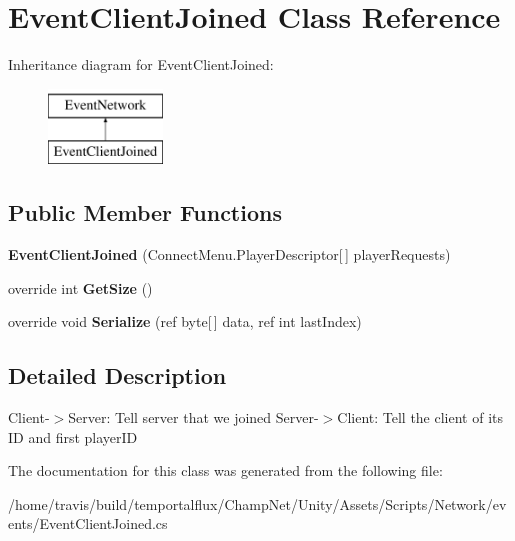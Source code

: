 \hypertarget{class_event_client_joined}{\section{Event\-Client\-Joined Class Reference}
\label{class_event_client_joined}
}
Inheritance diagram for Event\-Client\-Joined\-:\begin{figure}[H]
\begin{center}
\leavevmode
\includegraphics[height=2.000000cm]{class_event_client_joined}
\end{center}
\end{figure}
\subsection*{Public Member Functions}
\begin{DoxyCompactItemize}
\item 
\hypertarget{class_event_client_joined_adad9451ea1a292d0b4f6ce9465065bc4}{{\bfseries Event\-Client\-Joined} (Connect\-Menu.\-Player\-Descriptor\mbox{[}$\,$\mbox{]} player\-Requests)}\label{class_event_client_joined_adad9451ea1a292d0b4f6ce9465065bc4}

\item 
\hypertarget{class_event_client_joined_ad556a9c7eeb4a425ecf86ec271009241}{override int {\bfseries Get\-Size} ()}\label{class_event_client_joined_ad556a9c7eeb4a425ecf86ec271009241}

\item 
\hypertarget{class_event_client_joined_a10a9f8d247e3446fec1cc7a1eb13e6a0}{override void {\bfseries Serialize} (ref byte\mbox{[}$\,$\mbox{]} data, ref int last\-Index)}\label{class_event_client_joined_a10a9f8d247e3446fec1cc7a1eb13e6a0}

\end{DoxyCompactItemize}


\subsection{Detailed Description}
Client-\/$>$Server\-: Tell server that we joined Server-\/$>$Client\-: Tell the client of its I\-D and first player\-I\-D 

The documentation for this class was generated from the following file\-:\begin{DoxyCompactItemize}
\item 
/home/travis/build/temportalflux/\-Champ\-Net/\-Unity/\-Assets/\-Scripts/\-Network/events/Event\-Client\-Joined.\-cs\end{DoxyCompactItemize}
